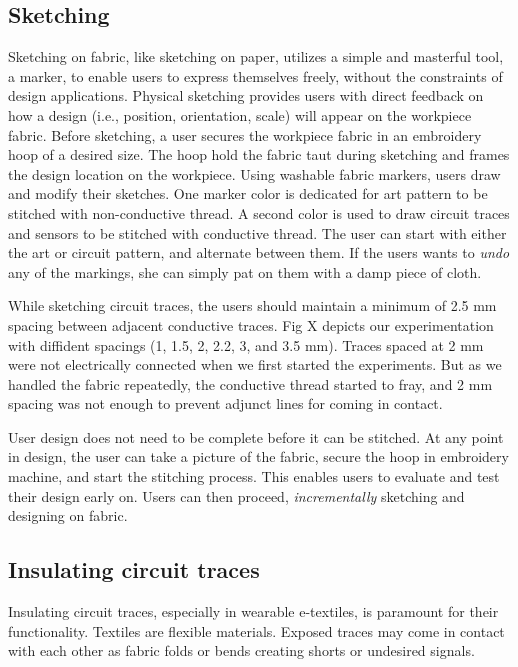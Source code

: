 \documentclass[header.tex]{subfiles}
\begin{document}
\subsection{Sketching}

Sketching on fabric, like sketching on paper, utilizes a simple and masterful tool, a marker, to enable users to express themselves freely, without the constraints of design applications. Physical sketching provides users with direct feedback on how a design (i.e., position, orientation, scale) will appear on the workpiece fabric. 
Before sketching, a user secures the workpiece fabric in an embroidery hoop of a desired size. The hoop hold the fabric taut during sketching and frames the design location on the workpiece. 
Using washable fabric markers, users draw and modify their sketches. One marker color is dedicated for art pattern to be stitched with non-conductive thread. A second color is used to draw circuit traces and sensors to be stitched with conductive thread. %
The user can start with either the art or circuit pattern, and alternate between them. If the users wants to \textit{undo} any of the markings, she can simply pat on them with a damp piece of cloth. 
 

While sketching circuit traces, the users should maintain a minimum of 2.5 mm spacing between adjacent conductive traces. Fig X depicts our experimentation with diffident spacings (1, 1.5, 2, 2.2, 3, and 3.5 mm). Traces spaced at 2 mm were not electrically connected when we first started the experiments. But as we handled the fabric repeatedly, the conductive thread started to fray, and 2 mm spacing was not enough to prevent adjunct lines for coming in contact. 

User design does not need to be complete before it can be stitched. At any point in design, the user can take a picture of the fabric, secure the hoop in embroidery machine, and start the stitching process. This enables users to evaluate and test their design early on. Users can then proceed, \textit{incrementally} sketching and designing on fabric.


\subsection{Insulating circuit traces}
Insulating circuit traces, especially in wearable e-textiles, is paramount for their functionality. Textiles are flexible materials. Exposed traces may come in contact with each other as fabric folds or bends creating shorts or undesired signals.
\end{document}
